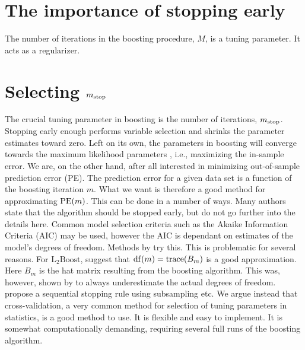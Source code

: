\section{The importance of stopping early}
The number of iterations in the boosting procedure, $M$, is a tuning parameter. It acts as a regularizer.


\section{Selecting $m_{\text{stop}}$}
The crucial tuning parameter in boosting is the number of iterations, $m_{\text{stop}}$. Stopping early enough performs variable selection and shrinks the parameter estimates toward zero. Left on its own, the parameters in boosting will converge towards the maximum likelihood parameters , i.e., maximizing the in-sample error. We are, on the other hand, after all interested in minimizing out-of-sample prediction error (PE). The prediction error for a given data set is a function of the boosting iteration $m$. What we want is therefore a good method for approximating $\operatorname{PE}(m)$. This can be done in a number of ways. Many authors state that the algorithm should be stopped early, but do not go further into the details here. Common model selection criteria such as the Akaike Information Criteria (AIC) may be used, however the AIC is dependant on estimates of the model's degrees of freedom. Methods by \citet{chang2010} try this. This is problematic for several reasons. For $\text{L}_2\text{Boost}$, \citet{buhlmann2007} suggest that $\operatorname{df}(m)=\operatorname{trace}(B_m)$ is a good approximation. Here $B_m$ is the hat matrix resulting from the boosting algorithm. This was, however, shown by \citet{hastie2007} to always underestimate the actual degrees of freedom. \citet{mayr-hofner} propose a sequential stopping rule using subsampling etc. We argue instead that cross-validation, a very common method for selection of tuning parameters in statistics, is a good method to use. It is flexible and easy to implement. It is somewhat computationally demanding, requiring several full runs of the boosting algorithm.

